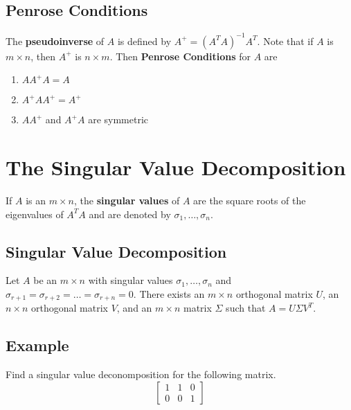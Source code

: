 \subsection*{Penrose Conditions}
The \textbf{pseudoinverse} of $A$ is defined by $A^{+}=(A^TA)^{-1}A^T$. Note that
if $A$ is $m\times n$, then $A^+$ is $n\times m$. Then \textbf{Penrose Conditions} for $A$ are
\begin{enumerate}
    \item $AA^+A=A$
    \item $A^+AA^+=A^+$
    \item $AA^+$ and $A^+A$ are symmetric
\end{enumerate}

\section{The Singular Value Decomposition}
If $A$ is an $m\times n$, the \textbf{singular values} of $A$ are the square roots
of the eigenvalues of $A^TA$ and are denoted by $\sigma_1,\dots, \sigma_n$.

\subsection*{Singular Value Decomposition}
Let $A$ be an $m\times n$ with singular values $\sigma_1,\dots, \sigma_n$ and
$\sigma_{r+1}=\sigma_{r+2}=\dots=\sigma_{r+n}=0$. There exists an $m\times n$
orthogonal matrix $U$, an $n\times n$ orthogonal matrix $V$, and an $m\times n$ matrix
$\Sigma$ such that $A=U\Sigma V^T$.

\subsection*{Example}
Find a singular value deconomposition for the following matrix.
\[\begin{bmatrix}
        1 & 1 & 0 \\
        0 & 0 & 1
    \end{bmatrix}\]

